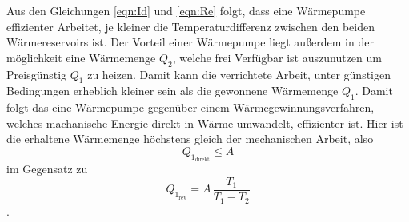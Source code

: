 Aus den Gleichungen \ref{eqn:Id} und \ref{eqn:Re} folgt, dass eine Wärmepumpe effizienter Arbeitet, je kleiner die Temperaturdifferenz
zwischen den beiden Wärmereservoirs ist. Der Vorteil einer Wärmepumpe liegt außerdem in der möglichkeit eine Wärmemenge $Q_2$, welche frei Verfügbar ist 
auszunutzen um Preisgünstig $Q_1$ zu heizen. Damit kann die verrichtete Arbeit, unter günstigen Bedingungen erheblich kleiner sein als die gewonnene Wärmemenge $Q_1$.
Damit folgt das eine Wärmepumpe gegenüber einem Wärmegewinnungsverfahren, welches machanische Energie direkt in Wärme umwandelt, effizienter ist.
Hier ist die erhaltene Wärmemenge höchstens gleich der mechanischen Arbeit, also
\begin{equation*}
    Q_{1_\text{direkt}}\leq A
\end{equation*}
im Gegensatz zu
\begin{equation*}
    Q_{1_\text{rev}}=A\,\frac{T_1}{T_1-T_2}
\end{equation*}.



